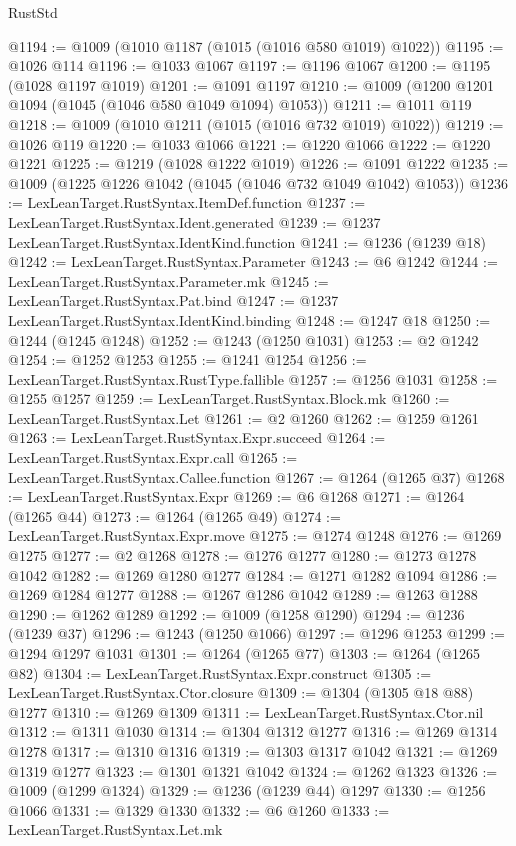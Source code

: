 \begin{lexlean}{RustStd}
\begin{coremodule}
{\begin{coremodule}
{{{{{{{{{{{{{{{{{{{{{{{{{{{{{{{{{{{@1194 := @1009 (@1010 @1187 (@1015 (@1016 @580 @1019) @1022))
@1195 := @1026 @114
@1196 := @1033 @1067
@1197 := @1196 @1067
@1200 := @1195 (@1028 @1197 @1019)
@1201 := @1091 @1197
@1210 := @1009 (@1200 @1201 @1094 (@1045 (@1046 @580 @1049 @1094) @1053))
@1211 := @1011 @119
@1218 := @1009 (@1010 @1211 (@1015 (@1016 @732 @1019) @1022))
@1219 := @1026 @119
@1220 := @1033 @1066
@1221 := @1220 @1066
@1222 := @1220 @1221
@1225 := @1219 (@1028 @1222 @1019)
@1226 := @1091 @1222
@1235 := @1009 (@1225 @1226 @1042 (@1045 (@1046 @732 @1049 @1042) @1053))
@1236 := LexLeanTarget.RustSyntax.ItemDef.function
@1237 := LexLeanTarget.RustSyntax.Ident.generated
@1239 := @1237 LexLeanTarget.RustSyntax.IdentKind.function
@1241 := @1236 (@1239 @18)
@1242 := LexLeanTarget.RustSyntax.Parameter
@1243 := @6 @1242
@1244 := LexLeanTarget.RustSyntax.Parameter.mk
@1245 := LexLeanTarget.RustSyntax.Pat.bind
@1247 := @1237 LexLeanTarget.RustSyntax.IdentKind.binding
@1248 := @1247 @18
@1250 := @1244 (@1245 @1248)
@1252 := @1243 (@1250 @1031)
@1253 := @2 @1242
@1254 := @1252 @1253
@1255 := @1241 @1254
@1256 := LexLeanTarget.RustSyntax.RustType.fallible
@1257 := @1256 @1031
@1258 := @1255 @1257
@1259 := LexLeanTarget.RustSyntax.Block.mk
@1260 := LexLeanTarget.RustSyntax.Let
@1261 := @2 @1260
@1262 := @1259 @1261
@1263 := LexLeanTarget.RustSyntax.Expr.succeed
@1264 := LexLeanTarget.RustSyntax.Expr.call
@1265 := LexLeanTarget.RustSyntax.Callee.function
@1267 := @1264 (@1265 @37)
@1268 := LexLeanTarget.RustSyntax.Expr
@1269 := @6 @1268
@1271 := @1264 (@1265 @44)
@1273 := @1264 (@1265 @49)
@1274 := LexLeanTarget.RustSyntax.Expr.move
@1275 := @1274 @1248
@1276 := @1269 @1275
@1277 := @2 @1268
@1278 := @1276 @1277
@1280 := @1273 @1278 @1042
@1282 := @1269 @1280 @1277
@1284 := @1271 @1282 @1094
@1286 := @1269 @1284 @1277
@1288 := @1267 @1286 @1042
@1289 := @1263 @1288
@1290 := @1262 @1289
@1292 := @1009 (@1258 @1290)
@1294 := @1236 (@1239 @37)
@1296 := @1243 (@1250 @1066)
@1297 := @1296 @1253
@1299 := @1294 @1297 @1031
@1301 := @1264 (@1265 @77)
@1303 := @1264 (@1265 @82)
@1304 := LexLeanTarget.RustSyntax.Expr.construct
@1305 := LexLeanTarget.RustSyntax.Ctor.closure
@1309 := @1304 (@1305 @18 @88) @1277
@1310 := @1269 @1309
@1311 := LexLeanTarget.RustSyntax.Ctor.nil
@1312 := @1311 @1030
@1314 := @1304 @1312 @1277
@1316 := @1269 @1314 @1278
@1317 := @1310 @1316
@1319 := @1303 @1317 @1042
@1321 := @1269 @1319 @1277
@1323 := @1301 @1321 @1042
@1324 := @1262 @1323
@1326 := @1009 (@1299 @1324)
@1329 := @1236 (@1239 @44) @1297
@1330 := @1256 @1066
@1331 := @1329 @1330
@1332 := @6 @1260
@1333 := LexLeanTarget.RustSyntax.Let.mk
}}}}}}}}}}}}}}}}}}}}}}}}}}}}}}}}}}}
\end{coremodule}}
\end{coremodule}
\end{lexlean}
